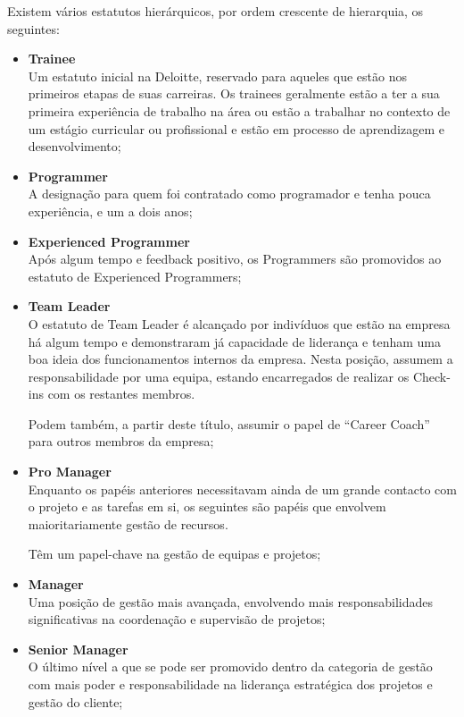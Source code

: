             Existem vários estatutos hierárquicos, por ordem crescente de hierarquia, os seguintes:

            \begin{itemize}
                \item \textbf{Trainee} \\
                    Um estatuto inicial na Deloitte, reservado para aqueles que estão nos primeiros etapas de suas carreiras. Os trainees geralmente estão a ter a sua primeira experiência de trabalho na área ou estão a trabalhar no contexto de um estágio curricular ou profissional e estão em processo de aprendizagem e desenvolvimento;
                \item \textbf{Programmer} \\
                    A designação para quem foi contratado como programador e tenha pouca experiência, e um a dois anos;
                \item \textbf{Experienced Programmer} \\
                    Após algum tempo e feedback positivo, os Programmers são promovidos ao estatuto de Experienced Programmers;
                \item \textbf{Team Leader} \\
                    O estatuto de Team Leader é alcançado por indivíduos que estão na empresa há algum tempo e demonstraram já capacidade de liderança e tenham uma boa ideia dos funcionamentos internos da empresa. Nesta posição, assumem a responsabilidade por uma equipa, estando encarregados de realizar os Check-ins com os restantes membros.
                    
                    Podem também, a partir deste título, assumir o papel de ``Career Coach'' para outros membros da empresa;
                \item \textbf{Pro Manager} \\
                    Enquanto os papéis anteriores necessitavam ainda de um grande contacto com o projeto e as tarefas em si, os seguintes são papéis que envolvem maioritariamente gestão de recursos.
                    
                    Têm um papel-chave na gestão de equipas e projetos;
                \item \textbf{Manager} \\
                    Uma posição de gestão mais avançada, envolvendo mais responsabilidades significativas na coordenação e supervisão de projetos;
                \item \textbf{Senior Manager} \\
                    O último nível a que se pode ser promovido dentro da categoria de gestão com mais poder e responsabilidade na liderança estratégica dos projetos e gestão do cliente;


\end{itemize}
